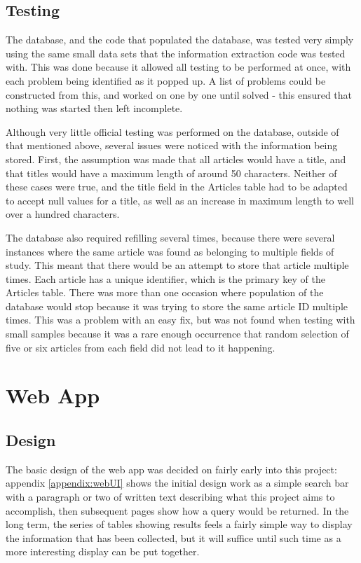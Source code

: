 \documentclass[11pt,a4paper]{book}
\begin{document}
\subsection{Testing}
The database, and the code that populated the database, was tested very simply using the same small data sets that the information extraction code was tested with. This was done because it allowed all testing to be performed at once, with each problem being identified as it popped up. A list of problems could be constructed from this, and worked on one by one until solved - this ensured that nothing was started then left incomplete. 

Although very little official testing was performed on the database, outside of that mentioned above, several issues were noticed with the information being stored. First, the assumption was made that all articles would have a title, and that titles would have a maximum length of around 50 characters. Neither of these cases were true, and the title field in the Articles table had to be adapted to accept null values for a title, as well as an increase in maximum length to well over a hundred characters. 

The database also required refilling several times, because there were several instances where the same article was found as belonging to multiple fields of study. This meant that there would be an attempt to store that article multiple times. Each article has a unique identifier, which is the primary key of the Articles table. There was more than one occasion where population of the database would stop because it was trying to store the same article ID multiple times. This was a problem with an easy fix, but was not found when testing with small samples because it was a rare enough occurrence that random selection of five or six articles from each field did not lead to it happening.

\section{Web App}
\subsection{Design}
The basic design of the web app was decided on fairly early into this project: appendix \ref{appendix:webUI} shows the initial design work as a simple search bar with a paragraph or two of written text describing what this project aims to accomplish, then subsequent pages show how a query would be returned. In the long term, the series of tables showing results feels a fairly simple way to display the information that has been collected, but it will suffice until such time as a more interesting display can be put together. 
\end{document}
